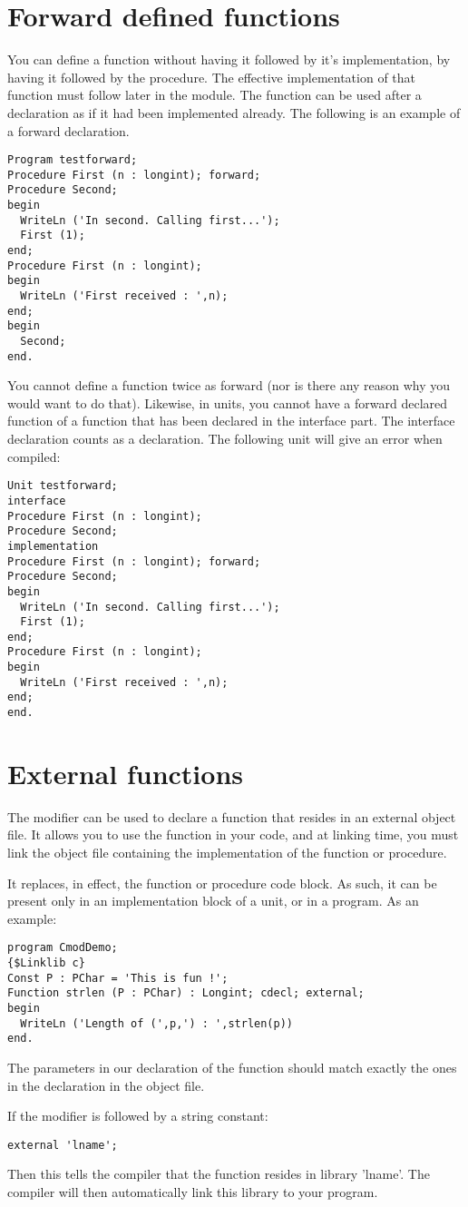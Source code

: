 \documentclass{report}
\begin{document}
\section{Forward defined functions}
You can define a function without having it followed by it's implementation,
by having it followed by the  procedure. The effective
implementation of that function must follow later in the module.
The function can be used after a  declaration as if it had been
implemented already.
The following is an example of a forward declaration.
\begin{verbatim}
Program testforward;
Procedure First (n : longint); forward;
Procedure Second;
begin
  WriteLn ('In second. Calling first...');
  First (1);
end;
Procedure First (n : longint);
begin
  WriteLn ('First received : ',n);
end;
begin
  Second;
end.
\end{verbatim}
You cannot define a function twice as forward (nor is there any reason why
you would want to do that).
Likewise, in units, you cannot have a forward declared function of a
function that has been declared in the interface part. The interface
declaration counts as a  declaration.
The following unit will give an error when compiled:
\begin{verbatim}
Unit testforward;
interface
Procedure First (n : longint);
Procedure Second;
implementation
Procedure First (n : longint); forward;
Procedure Second;
begin
  WriteLn ('In second. Calling first...');
  First (1);
end;
Procedure First (n : longint);
begin
  WriteLn ('First received : ',n);
end;
end.
\end{verbatim}

\section{External functions}
\label{se:external}
The  modifier can be used to declare a function that resides in
an external object file. It allows you to use the function in
your code, and at linking time, you must link the object file containing the
implementation of the function or procedure.

It replaces, in effect, the function or procedure code block. As such, it
can be present only in an implementation block of a unit, or in a program.
As an example:
\begin{verbatim}
program CmodDemo;
{$Linklib c}
Const P : PChar = 'This is fun !';
Function strlen (P : PChar) : Longint; cdecl; external;
begin
  WriteLn ('Length of (',p,') : ',strlen(p))
end.
\end{verbatim}
\begin{remark}
The parameters in our declaration of the  function
should match exactly the ones in the declaration in the object file.
\end{remark}
If the  modifier is followed by a string constant:
\begin{verbatim}
external 'lname';
\end{verbatim}
Then this tells the compiler that the function resides in library
'lname'. The compiler will then automatically link this library to
your program.
\end{document}
